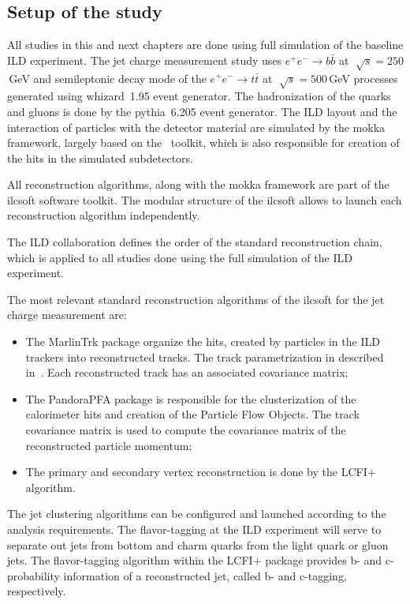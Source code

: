 \subsection{Setup of the study}

All studies in this and next chapters are done using full simulation of the baseline ILD experiment. 
The jet charge measurement study uses $e^+e^- \to b\bar{b}$ at $\sqrt[]{s} = 250$\,GeV and semileptonic decay mode of the $e^+e^- \to t\bar{t}$ at $\sqrt[]{s} = 500$\,GeV processes generated using {\sc whizard}~1.95 event generator. 
The hadronization of the quarks and gluons is done by the {\sc pythia}~6.205 event generator. 
The ILD layout and the interaction of particles with the detector material are simulated by the {\sc mokka} framework, largely based on the \geant\ toolkit, which is also responsible for creation of the hits in the simulated subdetectors. 

All reconstruction algorithms, along with the {\sc mokka} framework are part of the {\sc ilcsoft} software toolkit.
The modular structure of the {\sc ilcsoft} allows to  launch each reconstruction algorithm independently. 

The ILD collaboration defines the order of the standard reconstruction chain, which is applied to all studies done using the full simulation of the ILD experiment. 

The most relevant standard reconstruction algorithms of the {\sc ilcsoft} for the jet charge measurement are:
\begin{itemize}
\item The MarlinTrk package organize the hits, created by particles in the ILD trackers into reconstructed tracks. The track parametrization in described in~\cite{bib:LCIOtrack}. Each reconstructed track has an associated covariance matrix;
\item The PandoraPFA package is responsible for the clusterization of the calorimeter hits and creation of the Particle Flow Objects. The track covariance matrix is used to compute the covariance matrix of the reconstructed particle momentum; 
\item The primary and secondary vertex reconstruction is done by the LCFI+ algorithm. 
\end{itemize}
The jet clustering algorithms can be configured and launched according to the analysis requirements. 
The flavor-tagging at the ILD experiment will serve to separate out jets from bottom and charm quarks from the light quark or gluon jets.
The flavor-tagging algorithm within the LCFI+ package provides b- and c-probability information of a reconstructed jet, called b- and c-tagging, respectively.


